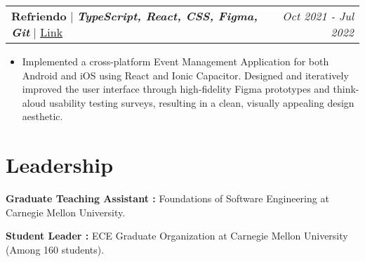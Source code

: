\documentclass[letterpaper]{article}
\makeatletter
\newcommand{\resumeItemWithoutTitle}[1]{
  \item{
    {#1 \vspace{-2pt}}
  }
}
\newcommand{\shortSection}[1]{
    \vspace{-6pt}
    \section{#1}
}
\newcommand{\projectHeading}[4]{
  \begin{tabular*}{\textwidth}{l@{\extracolsep{\fill}}r}
        \textbf{#1} 
        \hspace{-2pt} $\vert$ \hspace{-2pt} {\textit{\textbf{#2}}} 
        \hspace{-2pt} $\vert$ \hspace{-2pt} \href{#3}{ \underline{Link}}
        & 
        \textit{#4} \\
    \end{tabular*}\vspace{-2pt}
}
\newcommand{\projectHeadingWithoutLink}[3]{
  \begin{tabular*}{\textwidth}{l@{\extracolsep{\fill}}r}
        \textbf{#1} 
        \hspace{-2pt} $\vert$ \hspace{-2pt} {\textit{\textbf{#2}}}
        & 
        \textit{#3} \\
    \end{tabular*}\vspace{-2pt}
}
\newcommand*{\skill}[2]{
  \textbf{#1 : }#2 \\
  \vspace{1pt}
}
\newcommand{\resumeItemListStart}{\begin{itemize}}
\newcommand{\resumeItemListEnd}{\end{itemize}}
\makeatother
\begin{document}

\vspace{3pt}
\projectHeading {Refriendo}{TypeScript, React, CSS, Figma, Git}{https://www.figma.com/file/FpWVddCZKdJz5V7ADe4eb5/Refriendo}{Oct 2021 - Jul 2022}
\resumeItemListStart
\resumeItemWithoutTitle{Implemented a cross-platform Event Management Application for both Android and iOS using React and Ionic Capacitor. Designed and iteratively improved the user interface through high-fidelity Figma prototypes and think-aloud usability testing surveys, resulting in a clean, visually appealing design aesthetic.}
\resumeItemListEnd






\shortSection{Leadership}
\skill{Graduate Teaching Assistant}{Foundations of Software Engineering at Carnegie Mellon University.}
\skill{Student Leader}{ECE Graduate Organization at Carnegie Mellon University (Among 160 students).}
\end{document}

